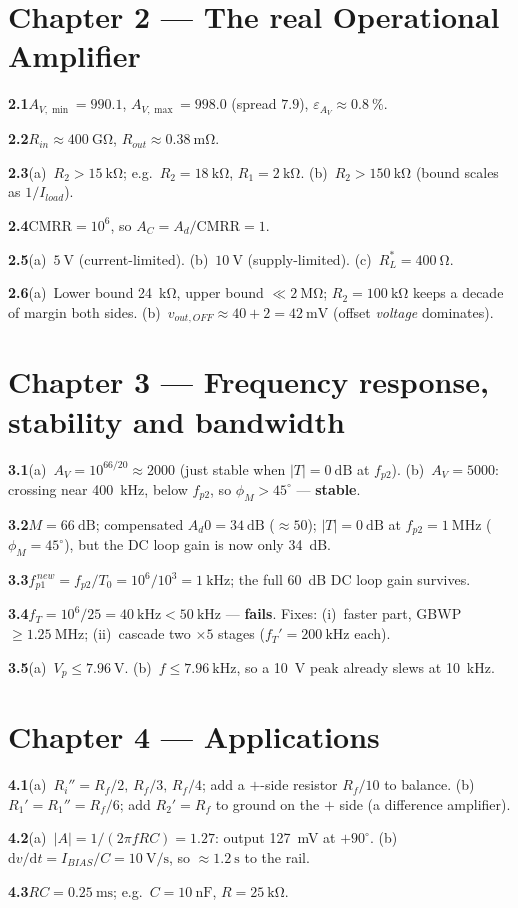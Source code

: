 \documentclass[11pt,a4paper,oneside]{book}
\newcommand{\Ad}{A_d}
\newcommand{\ans}[1]{\par\smallskip\noindent\textbf{#1}\quad\ignorespaces}
\begin{document}
\section*{Chapter 2 --- The real Operational Amplifier}
\ans{2.1}$A_{V,\min}=990.1$, $A_{V,\max}=998.0$ (spread $7.9$),
$\varepsilon_{A_V}\approx\qty{0.8}{\percent}$.
\ans{2.2}$R_{in}\approx\qty{400}{\giga\ohm}$, $R_{out}\approx\qty{0.38}{\milli\ohm}$.
\ans{2.3}(a)~$R_2>\qty{15}{\kilo\ohm}$; e.g.\ $R_2=\qty{18}{\kilo\ohm}$,
$R_1=\qty{2}{\kilo\ohm}$. (b)~$R_2>\qty{150}{\kilo\ohm}$ (bound scales as
$1/I_{load}$).
\ans{2.4}$\text{CMRR}=10^{6}$, so $A_C=\Ad/\text{CMRR}=1$.
\ans{2.5}(a)~$\qty{5}{\volt}$ (current-limited). (b)~$\qty{10}{\volt}$
(supply-limited). (c)~$R_L^*=\qty{400}{\ohm}$.
\ans{2.6}(a)~Lower bound \qty{24}{\kilo\ohm}, upper bound $\ll\qty{2}{\mega\ohm}$;
$R_2=\qty{100}{\kilo\ohm}$ keeps a decade of margin both sides.
(b)~$v_{out,OFF}\approx40+2=\qty{42}{\milli\volt}$ (offset \emph{voltage}
dominates).

\section*{Chapter 3 --- Frequency response, stability and bandwidth}
\ans{3.1}(a)~$A_V=10^{66/20}\approx2000$ (just stable when $|T|=\qty{0}{\dB}$ at
$f_{p2}$). (b)~$A_V=5000$: crossing near \qty{400}{\kilo\hertz}, below $f_{p2}$,
so $\phi_M>45^\circ$ --- \textbf{stable}.
\ans{3.2}$M=\qty{66}{\dB}$; compensated $\Ad0=\qty{34}{\dB}$ ($\approx50$);
$|T|=\qty{0}{\dB}$ at $f_{p2}=\qty{1}{\mega\hertz}$ ($\phi_M=45^\circ$), but the DC
loop gain is now only \qty{34}{\dB}.
\ans{3.3}$f_{p1}^{\,new}=f_{p2}/T_0=10^6/10^3=\qty{1}{\kilo\hertz}$; the full
\qty{60}{\dB} DC loop gain survives.
\ans{3.4}$f_T=10^6/25=\qty{40}{\kilo\hertz}<\qty{50}{\kilo\hertz}$ ---
\textbf{fails}. Fixes: (i)~faster part, GBWP $\ge\qty{1.25}{\mega\hertz}$;
(ii)~cascade two $\times5$ stages ($f_T'=\qty{200}{\kilo\hertz}$ each).
\ans{3.5}(a)~$V_p\le\qty{7.96}{\volt}$. (b)~$f\le\qty{7.96}{\kilo\hertz}$, so a
\qty{10}{\volt} peak already slews at \qty{10}{\kilo\hertz}.

\section*{Chapter 4 --- Applications}
\ans{4.1}(a)~$R_i''=R_f/2,\,R_f/3,\,R_f/4$; add a $+$-side resistor $R_f/10$ to
balance. (b)~$R_1'=R_1''=R_f/6$; add $R_2'=R_f$ to ground on the $+$ side (a
difference amplifier).
\ans{4.2}(a)~$|A|=1/(2\pi fRC)=1.27$: output \qty{127}{\milli\volt} at $+90^\circ$.
(b)~$\mathrm{d}v/\mathrm{d}t=I_{BIAS}/C=\qty{10}{\volt\per\second}$, so
$\approx\qty{1.2}{\second}$ to the rail.
\ans{4.3}$RC=\qty{0.25}{\milli\second}$; e.g.\ $C=\qty{10}{\nano\farad}$,
$R=\qty{25}{\kilo\ohm}$.
\end{document}
